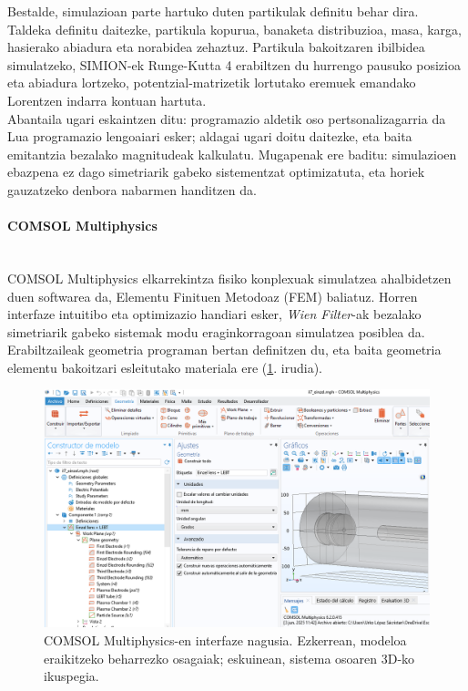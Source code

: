 \documentclass[12pt]{article}
\numberwithin{figure}{section}
\numberwithin{equation}{section}
\begin{document}
Bestalde, simulazioan parte hartuko duten partikulak definitu behar dira. Taldeka definitu daitezke, partikula kopurua, banaketa distribuzioa, masa, karga, hasierako abiadura eta norabidea zehaztuz. Partikula bakoitzaren ibilbidea simulatzeko, SIMION-ek Runge-Kutta 4 erabiltzen du hurrengo pausuko posizioa eta abiadura lortzeko, potentzial-matrizetik lortutako eremuek emandako Lorentzen indarra kontuan hartuta.\\

Abantaila ugari eskaintzen ditu: programazio aldetik oso pertsonalizagarria da Lua programazio lengoaiari esker; aldagai ugari doitu daitezke, eta baita emitantzia bezalako magnitudeak kalkulatu. Mugapenak ere baditu: simulazioen ebazpena ez dago simetriarik gabeko sistementzat optimizatuta, eta horiek gauzatzeko denbora nabarmen handitzen da.
\newpage

\paragraph{COMSOL Multiphysics}\leavevmode\\

COMSOL Multiphysics elkarrekintza fisiko konplexuak simulatzea ahalbidetzen duen softwarea da, Elementu Finituen Metodoaz (FEM) baliatuz. Horren interfaze intuitibo eta optimizazio handiari esker, \textit{Wien Filter}-ak bezalako simetriarik gabeko sistemak modu eraginkorragoan simulatzea posiblea da. Erabiltzaileak geometria programan bertan definitzen du, eta baita geometria elementu bakoitzari esleitutako materiala ere (\ref{fig:comsol_geometry}. irudia).

\begin{figure}[h]
    \centering
    \includegraphics[width=0.85\linewidth]{3 - COMSOL/comsol_geometry.PNG}
    \caption{COMSOL Multiphysics-en interfaze nagusia. Ezkerrean, modeloa eraikitzeko beharrezko osagaiak; eskuinean, sistema osoaren 3D-ko ikuspegia.}
    \label{fig:comsol_geometry}
\end{figure}
\end{document}
